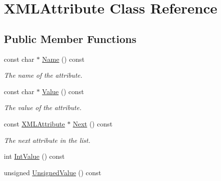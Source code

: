 \hypertarget{classtinyxml2_1_1_x_m_l_attribute}{\section{X\-M\-L\-Attribute Class Reference}
\label{classtinyxml2_1_1_x_m_l_attribute}
}
\subsection*{Public Member Functions}
\begin{DoxyCompactItemize}
\item 
\hypertarget{classtinyxml2_1_1_x_m_l_attribute_a6f8ea4f3037e8339cbd3e55d97ed08a9}{const char $\ast$ \hyperlink{classtinyxml2_1_1_x_m_l_attribute_a6f8ea4f3037e8339cbd3e55d97ed08a9}{Name} () const }\label{classtinyxml2_1_1_x_m_l_attribute_a6f8ea4f3037e8339cbd3e55d97ed08a9}

\begin{DoxyCompactList}\small\item\em The name of the attribute. \end{DoxyCompactList}\item 
\hypertarget{classtinyxml2_1_1_x_m_l_attribute_a67ec54cde5ef8dac7901ad63544c6d44}{const char $\ast$ \hyperlink{classtinyxml2_1_1_x_m_l_attribute_a67ec54cde5ef8dac7901ad63544c6d44}{Value} () const }\label{classtinyxml2_1_1_x_m_l_attribute_a67ec54cde5ef8dac7901ad63544c6d44}

\begin{DoxyCompactList}\small\item\em The value of the attribute. \end{DoxyCompactList}\item 
\hypertarget{classtinyxml2_1_1_x_m_l_attribute_a2d36543d8aa40bbf091730f1b733ecdc}{const \hyperlink{classtinyxml2_1_1_x_m_l_attribute}{X\-M\-L\-Attribute} $\ast$ \hyperlink{classtinyxml2_1_1_x_m_l_attribute_a2d36543d8aa40bbf091730f1b733ecdc}{Next} () const }\label{classtinyxml2_1_1_x_m_l_attribute_a2d36543d8aa40bbf091730f1b733ecdc}

\begin{DoxyCompactList}\small\item\em The next attribute in the list. \end{DoxyCompactList}\item 
int \hyperlink{classtinyxml2_1_1_x_m_l_attribute_a5cd782165fd71ed76685beb83c286bbd}{Int\-Value} () const 
\item 
\hypertarget{classtinyxml2_1_1_x_m_l_attribute_aa18b3f959b181fb264c08acf1c79fb64}{unsigned \hyperlink{classtinyxml2_1_1_x_m_l_attribute_aa18b3f959b181fb264c08acf1c79fb64}{Unsigned\-Value} () const }\label{classtinyxml2_1_1_x_m_l_attribute_aa18b3f959b181fb264c08acf1c79fb64}


\end{DoxyCompactItemize}
